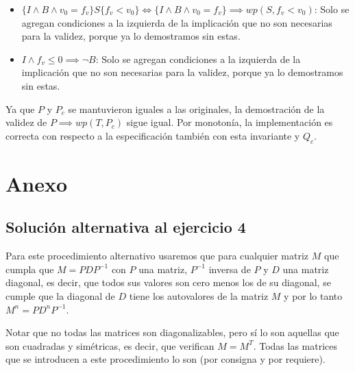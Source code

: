 \documentclass[10pt,a4paper]{article}
\begin{document}
\begin{itemize}
	Entonces, si sumamos todos los habitantes de la lista $ciudades$, este n\'umero mayor a 50.000 ser\'a sumado. 
	La \'unica forma de que la sumatoria total no sea mayor a 50.000 ser\'ia si existiera alg\'un n\'umero negativo entre los que se suman.
	Sabemos que esto no sucede gracias a otra condici\'on de $P$: 
	\begin{equation}
		\paraTodo[unalinea]{i}{\ent}{0 \le i < |ciudades| \implicaLuego ciudades[i].habitantes \ge 0}
	\end{equation}
	\item $\{I \land B \land v_{0} = f_{v}\}S\{f_{v} < v_{0}\} \iff \{I \land B \land v_{0} = f_{v}\} \implies wp(S, f_{v} < v_{0})$: Solo se agregan condiciones a la izquierda de la implicación 
	que no son necesarias para la validez, porque ya lo demostramos sin estas. 
	\item $I \land f_{v} \le 0 \implies \neg B$: Solo se agregan condiciones a la izquierda de la implicación 
	que no son necesarias para la validez, porque ya lo demostramos sin estas. 
\end{itemize}

Ya que $P$ y $P_{c}$ se mantuvieron iguales a las originales, la demostración de la validez de $P \implies wp(T, P_{c})$ sigue igual. Por monotonía, la implementación es correcta con respecto a la especificación también con 
esta invariante y $Q_{c}$.
	
\section{Anexo}
	\subsection{Solución alternativa al ejercicio 4}
		Para este procedimiento alternativo usaremos que para cualquier matriz $M$ que cumpla que $M = PDP^{-1}$ con $P$ una matriz,
		$P^{-1}$ inversa de $P$ y $D$ una matriz diagonal, es decir, que todos sus valores son cero menos los de su diagonal, se cumple que la diagonal
		de $D$ tiene los autovalores de la matriz $M$ y por lo tanto $M^{n} = PD^{n}P^{-1}$.
		
		Notar que no todas las matrices son diagonalizables, pero sí lo son aquellas que son cuadradas y simétricas,
		es decir, que verifican $M = M^{T}$. Todas las matrices que se introducen a este procedimiento lo son (por consigna y por requiere).
		
\end{document}
